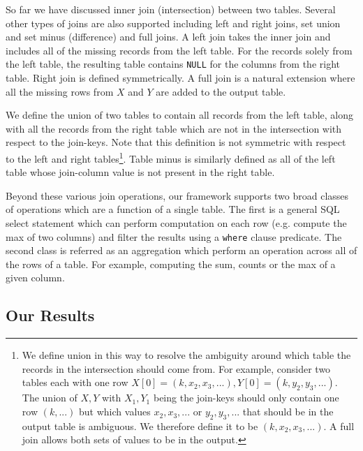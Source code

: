 \iffullversion
So far we have discussed inner join (intersection) between two tables. 
\fi
Several other types of joins are also supported including left and right joins, set union and set minus (difference) and full joins. A left join takes the inner join and includes all of the missing records from the left table. For the records solely from the left table, the resulting table contains \texttt{NULL} for the columns from the right table. Right join is defined symmetrically. A full join is a natural extension where all the missing rows from $X$ and $Y$ are added to the output table.

We define the union of two tables to contain all records from the left table, along with all the records from the right table which are not in the intersection with respect to the join-keys. Note that this definition is not symmetric with respect to the left and right tables\footnote{We define union in this way to resolve the ambiguity around which table the records in the intersection should come from. For example, consider two tables each with one row $X[0]=(k, x_2,x_3,...), Y[0]=(k, y_2,y_3,...)$. The union of $X,Y$ with $X_1,Y_1$ being the join-keys should only contain one row $(k,...)$ but which values $x_2,x_3,...$ or $y_2,y_3,...$ that should be in the output table is ambiguous. We therefore define it to be $(k,x_2,x_3,...)$. A full join allows both sets of values to be in the output.}. Table minus is similarly defined as all of the left table whose join-column value is not present in the right table. 

Beyond these various join operations, our framework supports two broad classes of operations which are a function of a single table. The first is a general SQL select statement which can perform computation on each row (e.g. compute the max of two columns) and filter the results using a \texttt{where} clause predicate. The second class is referred as an aggregation which perform an operation across all of the rows of a table. For example, computing the sum, counts or the max of a given column. 



\subsection{Our Results}

